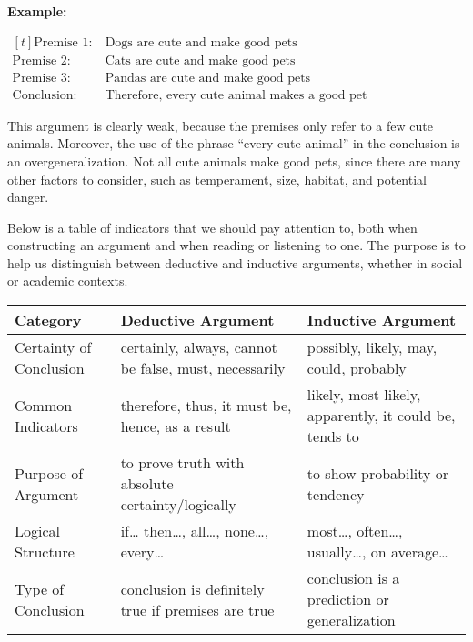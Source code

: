 \documentclass[12pt,a4paper,openany]{article}
\begin{document}
\textbf{Example:}

\noindent
\(
\begin{aligned}[t]
\text{Premise 1:} \ & \text{Dogs are cute and make good pets} \\
\text{Premise 2:} \ & \text{Cats are cute and make good pets} \\
\text{Premise 3:} \ & \text{Pandas are cute and make good pets} \\
\text{Conclusion:} \ & \text{Therefore, every cute animal makes a good pet}
\end{aligned}
\)

This argument is clearly weak, because the premises only refer to a few
cute animals. Moreover, the use of the phrase ``every cute animal'' in
the conclusion is an overgeneralization. Not all cute animals make good
pets, since there are many other factors to consider, such as
temperament, size, habitat, and potential danger.

Below is a table of indicators that we should pay attention to, both
when constructing an argument and when reading or listening to one. The
purpose is to help us distinguish between deductive and inductive
arguments, whether in social or academic contexts.

\begin{table}[h!]
\centering
\renewcommand{\arraystretch}{1.3} 
\begin{tabularx}{\textwidth}{|l|X|X|}
\hline
\textbf{Category} & \textbf{Deductive Argument} & \textbf{Inductive Argument} \\
\hline
Certainty of Conclusion & certainly, always, cannot be false, must, necessarily & possibly, likely, may, could, probably \\
\hline
Common Indicators & therefore, thus, it must be, hence, as a result & likely, most likely, apparently, it could be, tends to \\
\hline
Purpose of Argument & to prove truth with absolute certainty/logically & to show probability or tendency \\
\hline
Logical Structure & if\ldots{} then\ldots, all\ldots, none\ldots, every\ldots{} & most\ldots, often\ldots, usually\ldots, on average\ldots{} \\
\hline
Type of Conclusion & conclusion is definitely true if premises are true & conclusion is a prediction or generalization \\
\hline
\end{tabularx}
\label{tab:deductive-vs-inductive}
\end{table}
\end{document}
